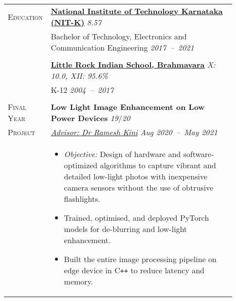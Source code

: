 \documentclass[letterpaper, 10pt, oneside]{article}
\newcommand{\stitle}[1]{\normalsize{\textsc{#1}}}
\newcommand{\bdit}[1]{{\textbf{#1}}}
\begin{document}
\begin{longtable}{@{} p{0.13\linewidth} p{0.8\linewidth}}
    \stitle{Education}   & \textbf{\href{https://nitk.ac.in}{National Institute of Technology Karnataka (NIT-K)}} \hfill \textsl{8.57}                                                                                                                   \\
                         & Bachelor of Technology, Electronics and Communication Engineering \hfill \hspace{-3em} \textsl{2017\ --\ 2021}                                                                                                                \\
    \\[-1.8ex]
                         & \textbf{\href{https://littlerock.edu.in}{Little Rock Indian School, Brahmavara}} \hfill \textsl{X: 10.0, XII: 95.6\%}                                                                                                         \\
                         & K-12 \hfill \textsl{2004\ --\ 2017}                                                                                                                                                                                           \\
    \\

    \stitle{Final Year}  & \bdit{Low Light Image Enhancement on Low Power Devices} \hfill \textsl{19}/\textsl{20}                                                                                                                                        \\
    \stitle{Project}     & \textsl{\href{https://ece.nitk.ac.in/faculty/ramesh-kini-m}{Advisor: Dr Ramesh Kini}} \hfill \textsl{Aug 2020\ --\ May 2021}                                                                                                  \\
                         & \parbox{0.8\textwidth}{                                                                                                                                                                                                       %
        \begin{itemize}[leftmargin=*, itemsep=-0.70ex, topsep=-0.88ex]
            \item \textsl{Objective:} Design of hardware and software-optimized algorithms to capture vibrant and detailed low-light photos with inexpensive camera sensors without the use of obtrusive flashlights.
            \item Trained, optimised, and deployed PyTorch models for de-blurring and low-light enhancement.
            \item Built the entire image processing pipeline on edge device in C\texttt{++} to reduce latency and memory.
        \end{itemize}
    }
    \\
    \\



\end{longtable}
\end{document}
